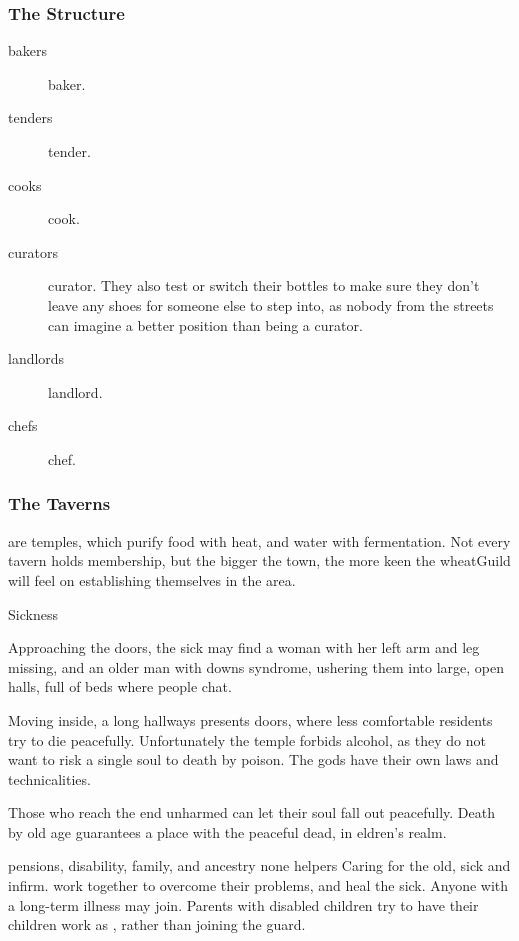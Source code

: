 \begin{multicols}{2}

\subsubsection{The Structure}

\begin{description}
  \item[\Glspl{baker}]
  \glsdesc{baker}.
  \item[\Glspl{tender}]
  \glsdesc{tender}.
  \item[\Glspl{cook}]
  \glsdesc{cook}.
  \item[\Glspl{curator}]
  \glsdesc{curator}.
  They also test or switch their bottles to make sure they don't leave any shoes for someone else to step into, as nobody from the streets can imagine a better position than being a curator.
  \item[\Glspl{landlord}]
  \glsdesc{landlord}.
  \item[\Glspl{chef}]
  \glsdesc{chef}.
\end{description}

\null
\subsubsection{The Taverns}
are temples, which purify food with heat, and water with fermentation.
Not every tavern holds membership, but the bigger the town, the more keen the \gls{wheatGuild} will feel on establishing themselves in the area.

  {Sickness}%
  {
    Approaching the doors, the sick may find a woman with her left arm and leg missing, and an older man with downs syndrome, ushering them into large, open halls, full of beds where people chat.

    Moving inside, a long hallways presents doors, where less comfortable residents try to die peacefully.
    Unfortunately the temple forbids alcohol, as they do not want to risk a single soul to death by poison.
    The gods have their own laws and technicalities.

    Those who reach the end unharmed can let their soul fall out peacefully.
    Death by old age guarantees a place with the peaceful dead, in \gls{eldren}'s realm.
  }%
  {pensions, disability, family, and ancestry}%
  {none}%
  {\Glspl{helper}}%
  {
    Caring for the old, sick and infirm.
  }%
work together to overcome their problems, and heal the sick.
Anyone with a long-term illness may join.
Parents with disabled children try to have their children work as , rather than joining the \gls{guard}.


\end{multicols}
